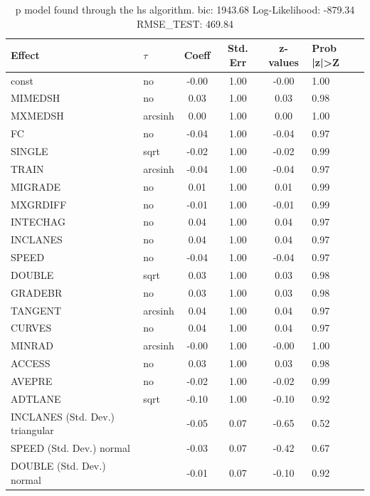 \begin{table}
	\caption{p model found through the hs algorithm. bic: 1943.68 Log-Likelihood: -879.34 RMSE_TEST: 469.84}
	\begin{center}
		\begin{tabular}{|l|l|c|c|c|l|}
			\hline
			Effect & $\tau$ & Coeff & Std. Err & z-values & Prob |z|>Z \\
			\hline
			const & no & -0.00 & 1.00 & -0.00 & 1.00 \\
			\hline
			MIMEDSH & no & 0.03 & 1.00 & 0.03 & 0.98 \\
			\hline
			MXMEDSH & arcsinh & 0.00 & 1.00 & 0.00 & 1.00 \\
			\hline
			FC & no & -0.04 & 1.00 & -0.04 & 0.97 \\
			\hline
			SINGLE & sqrt & -0.02 & 1.00 & -0.02 & 0.99 \\
			\hline
			TRAIN & arcsinh & -0.04 & 1.00 & -0.04 & 0.97 \\
			\hline
			MIGRADE & no & 0.01 & 1.00 & 0.01 & 0.99 \\
			\hline
			MXGRDIFF & no & -0.01 & 1.00 & -0.01 & 0.99 \\
			\hline
			INTECHAG & no & 0.04 & 1.00 & 0.04 & 0.97 \\
			\hline
			INCLANES & no & 0.04 & 1.00 & 0.04 & 0.97 \\
			\hline
			SPEED & no & -0.04 & 1.00 & -0.04 & 0.97 \\
			\hline
			DOUBLE & sqrt & 0.03 & 1.00 & 0.03 & 0.98 \\
			\hline
			GRADEBR & no & 0.03 & 1.00 & 0.03 & 0.98 \\
			\hline
			TANGENT & arcsinh & 0.04 & 1.00 & 0.04 & 0.97 \\
			\hline
			CURVES & no & 0.04 & 1.00 & 0.04 & 0.97 \\
			\hline
			MINRAD & arcsinh & -0.00 & 1.00 & -0.00 & 1.00 \\
			\hline
			ACCESS & no & 0.03 & 1.00 & 0.03 & 0.98 \\
			\hline
			AVEPRE & no & -0.02 & 1.00 & -0.02 & 0.99 \\
			\hline
			ADTLANE & sqrt & -0.10 & 1.00 & -0.10 & 0.92 \\
			\hline
			INCLANES (Std. Dev.) triangular &  & -0.05 & 0.07 & -0.65 & 0.52 \\
			\hline
			SPEED (Std. Dev.) normal &  & -0.03 & 0.07 & -0.42 & 0.67 \\
			\hline
			DOUBLE (Std. Dev.) normal &  & -0.01 & 0.07 & -0.10 & 0.92 \\

\end{tabular}
\end{center}
\end{table}
